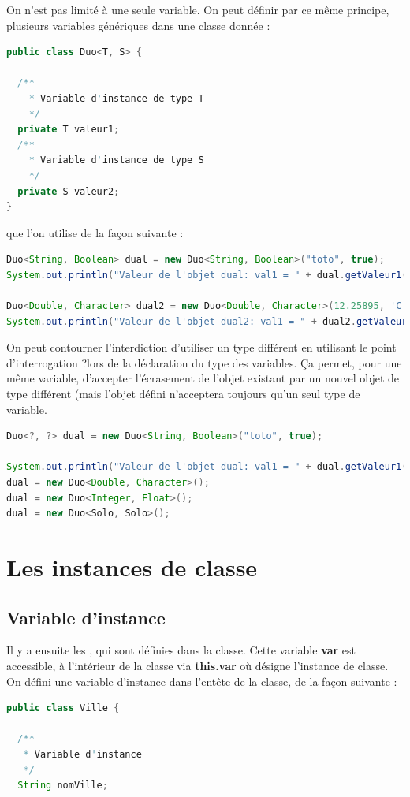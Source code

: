 \documentclass[a4paper,twoside]{article}
\begin{document}
\bigskip

On n'est pas limité à une seule variable. On peut définir par ce même principe, plusieurs variables génériques dans une classe donnée : 
\begin{lstlisting}[language=java]
public class Duo<T, S> {
 
  /**
    * Variable d'instance de type T
    */
  private T valeur1;
  /**
    * Variable d'instance de type S
    */
  private S valeur2;
}
\end{lstlisting}
que l'on utilise de la façon suivante :
\begin{lstlisting}[language=java]
Duo<String, Boolean> dual = new Duo<String, Boolean>("toto", true);
System.out.println("Valeur de l'objet dual: val1 = " + dual.getValeur1() + ", val2 = " + dual.getValeur2());

Duo<Double, Character> dual2 = new Duo<Double, Character>(12.25895, 'C');
System.out.println("Valeur de l'objet dual2: val1 = " + dual2.getValeur1() + ", val2 = " + dual2.getValeur2()); 
\end{lstlisting}

\bigskip

On peut contourner l'interdiction d'utiliser un type différent en utilisant le point d'interrogation \og ?\fg lors de la déclaration du type des variables. Ça permet, pour une même variable, d'accepter l'écrasement de l'objet existant par un nouvel objet de type différent (mais l'objet défini n'acceptera toujours qu'un seul type de variable. 

\begin{exemple}
\begin{lstlisting}[language=java]
Duo<?, ?> dual = new Duo<String, Boolean>("toto", true);

System.out.println("Valeur de l'objet dual: val1 = " + dual.getValeur1() + ", val2 = " + dual.getValeur2());
dual = new Duo<Double, Character>();
dual = new Duo<Integer, Float>();
dual = new Duo<Solo, Solo>();
\end{lstlisting}
\end{exemple}


\section{Les instances de classe}
\subsection{Variable d'instance}
Il y a ensuite les , qui sont définies dans la classe. Cette variable \textbf{var} est accessible, à l'intérieur de la classe via \textbf{this.var} où  désigne l'instance de classe. On défini une variable d'instance dans l'entête de la classe, de la façon suivante :
\begin{lstlisting}[language=java]
public class Ville {
 
  /**
   * Variable d'instance
   */
  String nomVille;
\end{lstlisting}
\end{document}
